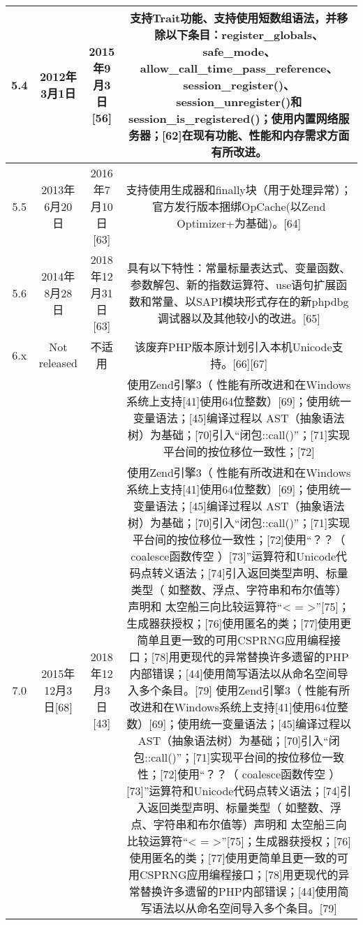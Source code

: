\begin{table}[ht]
\begin{tabular}{|c|c|c|c}
\hline
5.4 & 2012年3月1日 & 2015年9月3日[56] & 支持Trait功能、支持使用短数组语法，并移除以下条目：register_globals、safe_mode、allow_call_time_pass_reference、session_register()、session_unregister()和session_is_registered()；使用内置网络服务器；[62]在现有功能、性能和内存需求方面有所改进。\\
\hline
5.5 & 2013年6月20日 & 2016年7月10日[63] & 支持使用生成器和finally块（用于处理异常）；官方发行版本捆绑OpCache(以Zend Optimizer+为基础)。[64]\\
\hline
5.6 & 2014年8月28日 & 2018年12月31日[63] & 具有以下特性：常量标量表达式、变量函数、参数解包、新的指数运算符、use语句扩展函数和常量、以SAPI模块形式存在的新phpdbg调试器以及其他较小的改进。[65]\\
\hline
6.x & Not released & 不适用 & 该废弃PHP版本原计划引入本机Unicode支持。[66][67]\\
\hline
 &  &  & 使用Zend引擎3（ 性能有所改进和在Windows系统上支持[41]使用64位整数）[69]；使用统一变量语法；[45]编译过程以 AST（抽象语法树）为基础；[70]引入“闭包::call()”；[71]实现平台间的按位移位一致性；[72]\\
\hline
7.0 & 2015年12月3日[68] & 2018年12月3日[43] & 使用Zend引擎3（ 性能有所改进和在Windows系统上支持[41]使用64位整数）[69]；使用统一变量语法；[45]编译过程以 AST（抽象语法树）为基础；[70]引入“闭包::call()”；[71]实现平台间的按位移位一致性；[72]使用“？？（ coalesce函数传空 ）[73]”运算符和Unicode代码点转义语法；[74]引入返回类型声明、标量类型（ 如整数、浮点、字符串和布尔值等）声明和 太空船三向比较运算符“< = >”[75]；生成器获授权；[76]使用匿名的类；[77]使用更简单且更一致的可用CSPRNG应用编程接口；[78]用更现代的异常替换许多遗留的PHP内部错误；[44]使用简写语法以从命名空间导入多个条目。[79]
\hline
使用Zend引擎3（ 性能有所改进和在Windows系统上支持[41]使用64位整数）[69]；使用统一变量语法；[45]编译过程以 AST（抽象语法树）为基础；[70]引入“闭包::call()”；[71]实现平台间的按位移位一致性；[72]使用“？？（ coalesce函数传空 ）[73]”运算符和Unicode代码点转义语法；[74]引入返回类型声明、标量类型（ 如整数、浮点、字符串和布尔值等）声明和 太空船三向比较运算符“< = >”[75]；生成器获授权；[76]使用匿名的类；[77]使用更简单且更一致的可用CSPRNG应用编程接口；[78]用更现代的异常替换许多遗留的PHP内部错误；[44]使用简写语法以从命名空间导入多个条目。[79]
\hline

\hline

\hline

\hline

\hline

\hline
\end{tabular}
\end{table}